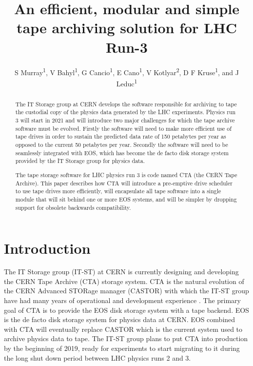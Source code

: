 \documentclass[a4paper]{jpconf}
\begin{document}
\title{An efficient, modular and simple tape archiving solution for LHC Run-3}

\author{S Murray\textsuperscript{1}, V Bahyl\textsuperscript{1}, G Cancio\textsuperscript{1}, E Cano\textsuperscript{1}, V Kotlyar\textsuperscript{2}, D F Kruse\textsuperscript{1}, and J Leduc\textsuperscript{1}}

\address{\textsuperscript{1}European Organization for Nuclear Research CERN, CH-1211 Gen\`eve 23}
\address{\textsuperscript{2}Institute for High Energy Physics, Russian Federation State Research Centre (IHEP), RU-142 281 Protvino Moscow Region, Russia}


\begin{abstract}
The IT Storage group at CERN develops the software responsible for archiving to
tape the custodial copy of the physics data generated by the LHC experiments.
Physics run 3 will start in 2021 and will introduce two major challenges for
which the tape archive software must be evolved. Firstly the software will need
to make more efficient use of tape drives in order to sustain the predicted data
rate of 150 petabytes per year as opposed to the current 50 petabytes per year.
Secondly the software will need to be seamlessly integrated with EOS, which has
become the de facto disk storage system provided by the IT Storage group for
physics data.

The tape storage software for LHC physics run 3 is code named CTA (the CERN Tape
Archive). This paper describes how CTA will introduce a pre-emptive drive
scheduler to use tape drives more efficiently, will encapsulate all tape
software into a single module that will sit behind one or more EOS systems, and
will be simpler by dropping support for obsolete backwards compatibility.
\end{abstract}

\section{Introduction} \label{introduction}

The IT Storage group (IT-ST) at CERN is currently designing and developing the
CERN Tape Archive (CTA) storage system.  CTA is the natural evolution of the
CERN Advanced STORage manager (CASTOR\cite{CASTOR}) with which the IT-ST
group have had many years of operational and development experience
\cite{experiences}.  The primary goal of CTA is to provide the EOS\cite{EOS} disk
storage system with a tape backend.  EOS is the de facto disk storage system for
physics data at CERN.  EOS combined with CTA will eventually replace CASTOR
which is the current system used to archive physics data to tape.  The IT-ST
group plans to put CTA into production by the beginning of 2019, ready for
experiments to start migrating to it during the long shut down period between
LHC physics runs 2 and 3.
\end{document}

